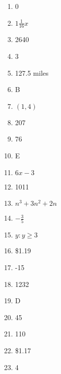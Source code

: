 \documentclass[../uilmath.tex]{subfiles}
\begin{document}
\begin{enumerate}[label=\bfseries\arabic*.]
    \item %
    0

    \item %
    $1\frac{1}{16}x$

    \item %
    2640 

    \item %
    3

    \item %
    127.5 miles 

    \item %
    B 

    \item %
    $(1,4)$

    \item %
    207 

    \item %
    76

    \item %
    E 

    \item %
    $6x-3$

    \item %
    1011

    \item %
    $n^3+3n^2+2n$

    \item %
    $-\frac{3}{5}$

    \item %
    ${y:y\geq 3}$

    \item %
    \$1.19

    \item %
    -15

    \item %
    1232

    \item %
    D 

    \item %
    45

    \item %
    110

    \item %
    \$1.17

    \item %
    4


\end{enumerate}
\end{document}
